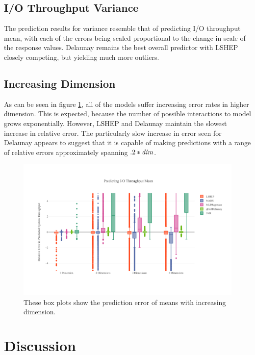 \documentclass{scspaperproc}
\theoremstyle{scsthe}
\newcommand{\rpm}{\raisebox{.2ex}{$\scriptstyle\pm$}}
\begin{document}
\subsection{I/O Throughput Variance}

The prediction results for variance resemble that of predicting I/O
throughput mean, with each of the errors being scaled proportional to
the change in scale of the response values. Delaunay remains the best
overall predictor with LSHEP closely competing, but yielding much more
outliers.

\subsection{Increasing Dimension}

As can be seen in figure \ref{fig:mean_dim}, all of the models suffer
increasing error rates in higher dimension. This is expected, because
the number of possible interactions to model grows
exponentially. However, LSHEP and Delaunay maintain the slowest
increase in relative error. The particularly slow increase in error
seen for Delaunay appears to suggest that it is capable of making
predictions with a range of relative errors approximately spanning
\rpm $.2*\text{\textit{dim}}$. 

\begin{figure}
  \centering
  \includegraphics[width=\textwidth,trim={0 1in 0 2in}]{Mean_Dim.pdf}
  \caption{These box plots show the prediction error of means with
    increasing dimension. }
  \label{fig:mean_dim}
\end{figure}

\section{Discussion}
\label{sec:discussion}
\end{document}
